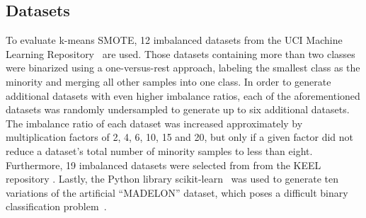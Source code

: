 \documentclass[sort&compress]{elsarticle}
\begin{document}
	\subsection{Datasets}
    \label{sec:datasets}
	To evaluate k-means \ac{SMOTE}, 12 imbalanced datasets from the UCI Machine Learning Repository~\citep{Lichman.2013} are used. Those datasets containing more than two classes were binarized using a one-versus-rest approach, labeling the smallest class as the minority and merging all other samples into one class. In order to generate additional datasets with even higher imbalance ratios, each of the aforementioned datasets was randomly undersampled to generate up to six additional datasets. The imbalance ratio of each dataset was increased approximately by multiplication factors of 2, 4, 6, 10, 15 and 20, but only if a given factor did not reduce a dataset's total number of minority samples to less than eight. Furthermore, 19 imbalanced datasets were selected from from the KEEL repository \cite{Alcala-fdez.2011}. Lastly, the Python library scikit-learn~\citep{Pedregosa.2011} was used to generate ten variations of the artificial ``MADELON'' dataset, which poses a difficult binary classification problem~\citep{Guyon.2003}.
\end{document}
